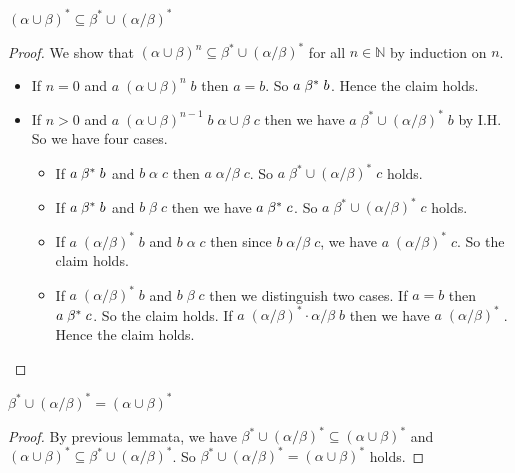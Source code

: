 \documentclass[12pt,aspectratio=169]{beamer}
\begin{document}
\begin{frame}
    \begin{lemma}
        $(\alpha \cup \beta)^* \subseteq \beta^* \cup (\alpha/\beta)^*$
    \end{lemma}
    \pause
    \begin{proof}
        We show that $(\alpha \cup \beta)^n \subseteq \beta^* \cup (\alpha/\beta)^*$ for all $n \in \mathbb{N}$ by induction on $n$.
        \pause
        \begin{itemize}
            \item If $n = 0$ and $a\; (\alpha \cup \beta)^n \; b$ then $a =b$. So $a \;\beta^*\; b$.
            Hence the claim holds.
            \pause
            \item If $n > 0$ and $a\; (\alpha \cup \beta)^{n-1} \; b \; \alpha \cup \beta\; c$
            then we have $a \;\beta^* \cup (\alpha/\beta)^*\; b$ by I.H. So we have four cases.
            \pause
            \begin{itemize}
                \item If $a \;\beta^*\; b$ and $b\; \alpha \;c$ then $a\; \alpha/\beta\;c$. So $a\; \beta^* \cup (\alpha/\beta)^*\; c$ holds.
                \pause
                \item If $a \;\beta^*\; b$ and $b \;\beta\; c$ then we have $a \;\beta^*\; c$. So $a\; \beta^* \cup (\alpha/\beta)^*\; c$ holds.
                \pause
                \item If $a \; (\alpha/\beta)^*\; b$ and $b \; \alpha \;c$ then
                \pause
                since $b\; \alpha/\beta\; c$, we have $a \; (\alpha/\beta)^*\; c$. So the claim holds.
                \item If $a \; (\alpha/\beta)^*\; b$ and $b \; \beta \; c$ then we distinguish two cases.
                \pause
                If $a = b$ then $a \;\beta^*\; c$. So the claim holds.
                \pause
                If $a \;(\alpha/\beta)^* \cdot \alpha/\beta\; b$ then we have $a \;(\alpha/\beta)^*\;$.
                Hence the claim holds. 
            \end{itemize}
        \end{itemize}
    \end{proof}
\end{frame}

\begin{frame}
    \begin{lemma}
        $\beta^* \cup (\alpha/\beta)^* = (\alpha \cup \beta)^*$
    \end{lemma}
    \pause
    \begin{proof}
        By previous lemmata, we have
        $\beta^* \cup (\alpha/\beta)^* \subseteq (\alpha \cup \beta)^*$ and
        $(\alpha \cup \beta)^* \subseteq \beta^* \cup (\alpha/\beta)^*$.
        So $\beta^* \cup (\alpha/\beta)^* = (\alpha \cup \beta)^*$ holds.
    \end{proof}
\end{frame}
\end{document}

